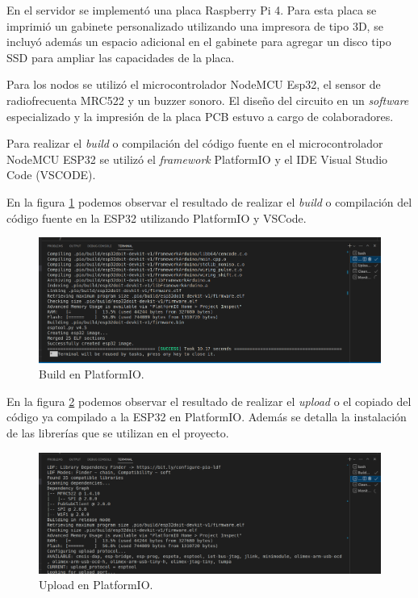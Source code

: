 En el servidor se implementó una placa Raspberry Pi 4. Para esta placa se imprimió un gabinete personalizado utilizando una impresora de tipo 3D, se incluyó además un espacio adicional en el gabinete para agregar un disco tipo SSD para ampliar las capacidades de la placa.


Para los nodos se utilizó el microcontrolador NodeMCU Esp32, el sensor de radiofrecuenta MRC522 y un buzzer sonoro. El diseño del circuito en un \textit{software} especializado y la impresión de la placa PCB estuvo a cargo de colaboradores.  

Para realizar el \textit{build} o compilación del código fuente en el microcontrolador NodeMCU ESP32 se utilizó el \textit{framework} PlatformIO y el IDE Visual Studio Code (VSCODE).

En la figura \ref{fig:platformio-build} podemos observar el resultado de realizar el \textit{build}  o compilación del código fuente en la ESP32 utilizando PlatformIO y VSCode.

\begin{figure}[H]
	\centering
	\includegraphics[width=\textwidth]{./Figures/platformio-build.png}
	\caption{Build en PlatformIO.}
	\label{fig:platformio-build}
\end{figure}

En la figura \ref{fig:platformio-upload} podemos observar el resultado de realizar el \textit{upload} o el copiado del código ya compilado a la ESP32 en PlatformIO. Además se detalla la instalación de las librerías que se utilizan en el proyecto.

\begin{figure}[H]
	\centering
	\includegraphics[width=\textwidth]{./Figures/platformio-upload.png}
	\caption{Upload en PlatformIO.}
	\label{fig:platformio-upload}
\end{figure}

